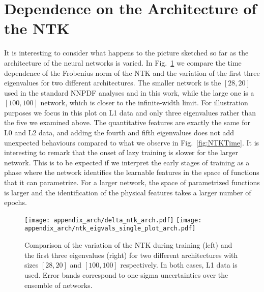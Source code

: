 \section{Dependence on the Architecture of the NTK}
\label{sec:NTKArchDep}

It is interesting to consider what happens to the picture sketched so far as the
architecture of the neural networks is varied. In Fig.~\ref{fig:NTKTimeDiffArch}
we compare the time dependence of the Frobenius norm of the NTK and the
variation of the first three eigenvalues for two different architectures. The
smaller network is the $[28,20]$ used in the standard NNPDF analyses and in this
work, while the large one is a $[100,100]$ network, which is closer to the
infinite-width limit. For illustration purposes we focus in this plot on L1 data
and only three eigenvalues rather than the five we examined above. The
quantitative features are exactly the same for L0 and L2 data, and adding the
fourth and fifth eigenvalues does not add unexpected behaviours compared to what
we observe in Fig.~\ref{fig:NTKTime}. It is interesting to remark that the onset
of lazy training is slower for the larger network. This is to be expected if we
interpret the early stages of training as a phase where the network identifies
the learnable features in the space of functions that it can parametrize. For a
larger network, the space of parametrized functions is larger and the
identification of the physical features takes a larger number of epochs. 
\begin{figure}[ht!]
  \centering
  \texttt{[image: appendix\_arch/delta\_ntk\_arch.pdf]}
  \texttt{[image: appendix\_arch/ntk\_eigvals\_single\_plot\_arch.pdf]}
  \caption{Comparison of the variation of the NTK during training (left) and the
  first three eigenvalues (right) for two different architectures with sizes
  $[28,20]$ and $[100,100]$ respectively. In both cases, L1 data is used. Error
  bands correspond to one-sigma uncertainties over the ensemble of networks.}
  \label{fig:NTKTimeDiffArch}
\end{figure}

\FloatBarrier